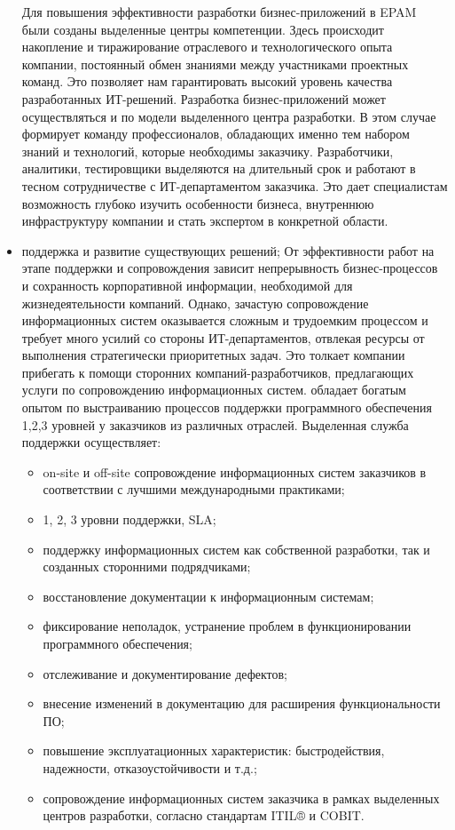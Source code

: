 \begin{itemize}
  Для повышения эффективности разработки бизнес-приложений в EPAM были созданы выделенные центры компетенции. Здесь происходит накопление и тиражирование отраслевого и технологического опыта компании, постоянный обмен знаниями между участниками проектных команд. Это позволяет нам гарантировать высокий уровень качества разработанных ИТ-решений.
  Разработка бизнес-приложений может осуществляться и по модели выделенного центра разработки. В этом случае \company{} формирует команду профессионалов, обладающих именно тем набором знаний и технологий, которые необходимы заказчику. Разработчики, аналитики, тестировщики выделяются на длительный срок и работают в тесном сотрудничестве с ИТ-департаментом заказчика. Это дает специалистам возможность глубоко изучить особенности бизнеса, внутреннюю инфраструктуру компании и стать экспертом в конкретной области.

  \item поддержка и развитие существующих решений;
  От эффективности работ на этапе поддержки и сопровождения зависит непрерывность бизнес-процессов и сохранность корпоративной информации, необходимой для жизнедеятельности компаний. Однако, зачастую сопровождение информационных систем оказывается сложным и трудоемким процессом и требует много усилий со стороны ИТ-департаментов, отвлекая ресурсы от выполнения стратегически приоритетных задач. Это толкает компании прибегать к помощи сторонних компаний-разработчиков, предлагающих услуги по сопровождению информационных систем.
  \company{} обладает богатым опытом по выстраиванию процессов поддержки программного обеспечения 1,2,3 уровней у заказчиков из различных отраслей.
  Выделенная служба поддержки осуществляет:
  \begin{itemize}
    \item on-site и off-site сопровождение информационных систем заказчиков в соответствии с лучшими международными практиками;
    \item 1, 2, 3 уровни поддержки, SLA;
    \item поддержку информационных систем как собственной разработки, так и созданных сторонними подрядчиками;
    \item восстановление документации к информационным системам;
    \item фиксирование неполадок, устранение проблем в функционировании программного обеспечения;
    \item отслеживание и документирование дефектов;
    \item внесение изменений в документацию для расширения функциональности ПО;
    \item повышение эксплуатационных характеристик: быстродействия, надежности, отказоустойчивости и т.д.;
    \item сопровождение информационных систем заказчика в рамках выделенных центров разработки, согласно стандартам ITIL® и COBIT.
  \end{itemize}


\end{itemize}
